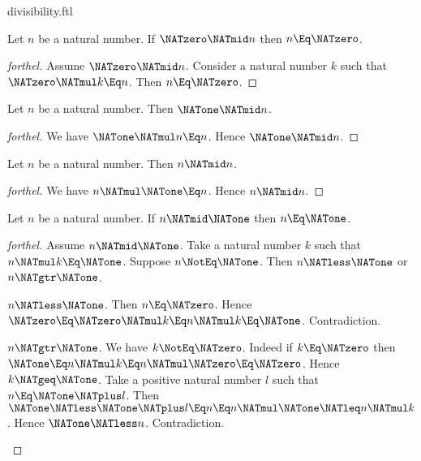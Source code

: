 \documentclass{stex}
\begin{document}
\begin{smodule}{divisibility.ftl}
\begin{proposition}[forthel,id=ARITHMETIC_07_8611150130315264]
  Let $n$ be a natural number.
  If $\NATzero \NATmid n$ then $n \Eq \NATzero$.
\end{proposition}
\begin{proof}[forthel]
  Assume $\NATzero \NATmid n$.
  Consider a natural number $k$ such that $\NATzero \NATmul k \Eq n$.
  Then $n \Eq \NATzero$.
\end{proof}

\begin{proposition}[forthel,id=ARITHMETIC_07_1259086070939648]
  Let $n$ be a natural number.
  Then $\NATone \NATmid n$.
\end{proposition}
\begin{proof}[forthel]
  We have $\NATone \NATmul n \Eq n$.
  Hence $\NATone \NATmid n$.
\end{proof}

\begin{proposition}[forthel,id=ARITHMETIC_07_3944887330275328]
  Let $n$ be a natural number.
  Then $n \NATmid n$.
\end{proposition}
\begin{proof}[forthel]
  We have $n \NATmul \NATone \Eq n$.
  Hence $n \NATmid n$.
\end{proof}

\begin{proposition}[forthel,id=ARITHMETIC_07_6917446193643520]
  Let $n$ be a natural number.
  If $n \NATmid \NATone$ then $n \Eq \NATone$.
\end{proposition}
\begin{proof}[forthel]
  Assume $n \NATmid \NATone$.
  Take a natural number $k$ such that $n \NATmul k \Eq \NATone$.
  Suppose $n \NotEq \NATone$.
  Then $n \NATless \NATone$ or $n \NATgtr \NATone$.

  \begin{case}{$n \NATless \NATone$.}
    Then $n \Eq \NATzero$.
    Hence $\NATzero
      \Eq \NATzero \NATmul k
      \Eq n \NATmul k
      \Eq \NATone$.
    Contradiction.
  \end{case}

  \begin{case}{$n \NATgtr \NATone$.}
    We have $k \NotEq \NATzero$.
    Indeed if $k \Eq \NATzero$ then
    $\NATone
      \Eq n \NATmul k
      \Eq n \NATmul \NATzero
      \Eq \NATzero$.
    Hence $k \NATgeq \NATone$.
    Take a positive natural number $l$ such that $n \Eq \NATone \NATplus l$.
    Then $\NATone
      \NATless \NATone \NATplus l
      \Eq n
      \Eq n \NATmul \NATone
      \NATleq n \NATmul k$.
    Hence $\NATone \NATless n$.
    Contradiction.
  \end{case}
\end{proof}


\end{smodule}
\end{document}
